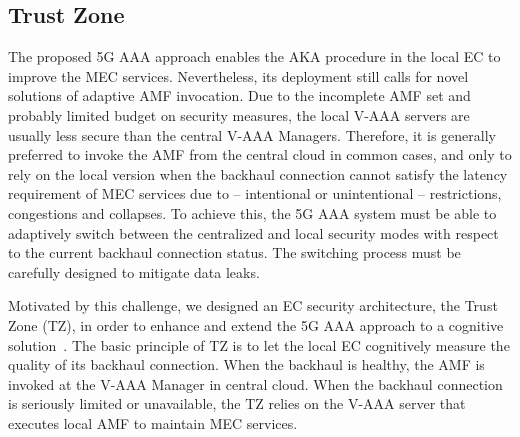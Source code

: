 \documentclass{ieeeaccess}
\begin{document}
	
	\subsection{Trust Zone}\label{subsec:tz}
	The proposed 5G AAA \cite{stan2017v-aaa} approach enables the AKA procedure in the local EC to improve the MEC services. Nevertheless, its deployment still calls for novel solutions of adaptive AMF invocation. Due to the incomplete AMF set and probably limited budget on security measures, the local V-AAA servers are usually less secure than the central V-AAA Managers. Therefore, it is generally preferred to invoke the AMF from the central cloud in common cases, and only to rely on the local version when the backhaul connection cannot satisfy the latency requirement of MEC services due to -- intentional or unintentional -- restrictions, congestions and collapses. To achieve this, the 5G AAA system must be able to adaptively switch between the centralized and local security modes with respect to the current backhaul connection status. The switching process must be carefully designed to mitigate data leaks.
	
	Motivated by this challenge, we designed an EC security architecture, the Trust Zone (TZ), in order to enhance and extend the 5G AAA approach to a cognitive solution~\cite{han2017security}. The basic principle of TZ is to let the local EC cognitively measure the quality of its backhaul connection. When the backhaul is healthy, the AMF is invoked at the V-AAA Manager in central cloud. When the backhaul connection is seriously limited or unavailable, the TZ relies on the V-AAA server that executes local AMF to maintain MEC services.
	
\end{document}
